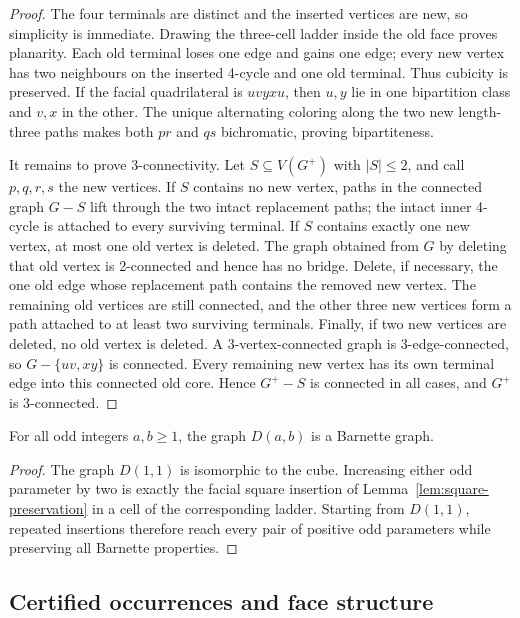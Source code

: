 \begin{proof}
The four terminals are distinct and the inserted vertices are new, so
simplicity is immediate.  Drawing the three-cell ladder inside the old face
proves planarity.  Each old terminal loses one edge and gains one edge; every
new vertex has two neighbours on the inserted 4-cycle and one old terminal.
Thus cubicity is preserved.  If the facial quadrilateral is
\(uvyxu\), then \(u,y\) lie in one bipartition class and \(v,x\) in the other.
The unique alternating coloring along the two new length-three paths makes
both \(pr\) and \(qs\) bichromatic, proving bipartiteness.

It remains to prove 3-connectivity.  Let \(S\subseteq V(G^+)\) with
\(|S|\le2\), and call \(p,q,r,s\) the new vertices.  If \(S\) contains no new
vertex, paths in the connected graph \(G-S\) lift through the two intact
replacement paths; the intact inner 4-cycle is attached to every surviving
terminal.  If \(S\) contains exactly one new vertex, at most one old vertex is
deleted.  The graph obtained from \(G\) by deleting that old vertex is
2-connected and hence has no bridge.  Delete, if necessary, the one old edge
whose replacement path contains the removed new vertex.  The remaining old
vertices are still connected, and the other three new vertices form a path
attached to at least two surviving terminals.  Finally, if two new vertices
are deleted, no old vertex is deleted.  A 3-vertex-connected graph is
3-edge-connected, so \(G-\{uv,xy\}\) is connected.  Every remaining new
vertex has its own terminal edge into this connected old core.  Hence
\(G^+-S\) is connected in all cases, and \(G^+\) is 3-connected.
\end{proof}

\begin{theorem}
\label{thm:double-ladder-barnette}
For all odd integers \(a,b\ge1\), the graph \(D(a,b)\) is a Barnette graph.
\end{theorem}

\begin{proof}
The graph \(D(1,1)\) is isomorphic to the cube.  Increasing either odd
parameter by two is exactly the facial square insertion of
Lemma~\ref{lem:square-preservation} in a cell of the corresponding ladder.  Starting
from \(D(1,1)\), repeated insertions therefore reach every pair of positive odd
parameters while preserving all Barnette properties.
\end{proof}

\subsection{Certified occurrences and face structure}

